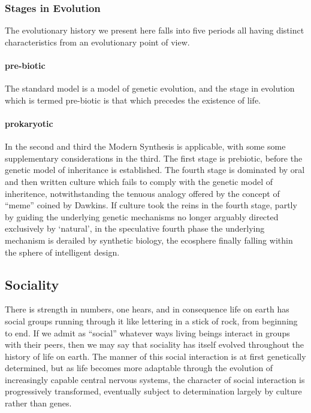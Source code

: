\documentclass[10pt,titlepage]{article}
\begin{document}
\subsubsection{Stages in Evolution}

The evolutionary history we present here falls into five periods all having distinct characteristics from an evolutionary point of view.

\paragraph{pre-biotic}

The standard model is a model of genetic evolution, and the stage in evolution which is termed pre-biotic is that which precedes the existence of life.

\paragraph{prokaryotic}

In the second and third the Modern Synthesis is applicable, with some some supplementary considerations in the third.
The first stage is prebiotic, before the genetic model of inheritance is established.
The fourth stage is dominated by oral and then written culture which fails to comply with the genetic model of inheritence, notwithstanding the tenuous analogy offered by the concept of ``meme''
coined by Dawkins.
If culture took the reins in the fourth stage, partly by guiding the underlying genetic mechanisms no longer arguably directed exclusively by `natural', in the speculative fourth phase the underlying mechanism is derailed by synthetic biology, the ecosphere finally falling within the sphere of intelligent design.

\subsection{Sociality}

There is strength in numbers, one hears, and in consequence life on earth has social groups running through it like lettering in a stick of rock, from beginning to end.
If we admit as ``social'' whatever ways living beings interact in groups with their peers, then we may say that sociality has itself evolved throughout the history of life on earth.
The manner of this social interaction is at first genetically determined, but as life becomes more adaptable through the evolution of increasingly capable central nervous systems, the character of social interaction is progressively transformed, eventually subject to determination largely by culture rather than genes.
\end{document}
